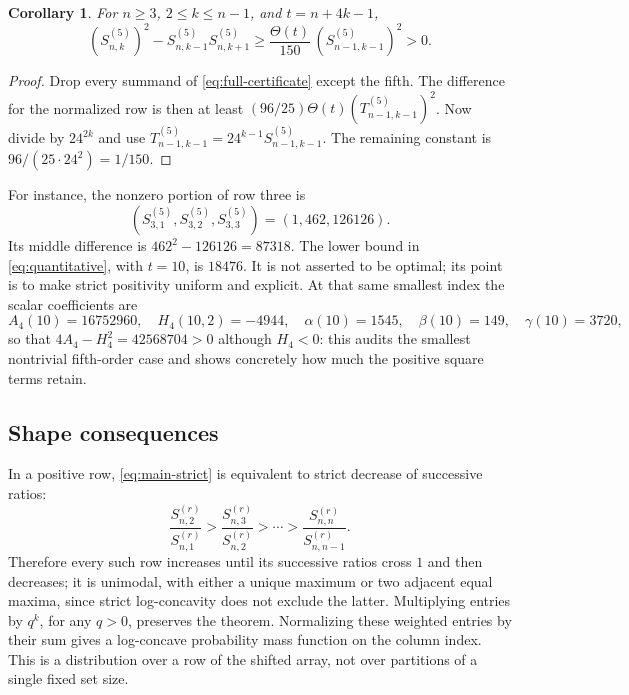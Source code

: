 \documentclass[11pt,a4paper]{article}
\numberwithin{equation}{section}
\newtheorem{corollary}[corollary]{Corollary}
\theoremstyle{definition}
\theoremstyle{remark}
\newcommand{\Snum}[3]{S^{(#1)}_{#2,#3}}
\begin{document}
\begin{corollary}\label{cor:quantitative}
For $n\ge3$, $2\le k\le n-1$, and $t=n+4k-1$,
\begin{equation}\label{eq:quantitative}
 (\Snum5nk)^2-\Snum5n{k-1}\Snum5n{k+1}
 \ge\frac{\Theta(t)}{150}\,(\Snum5{n-1}{k-1})^2>0.
\end{equation}
\end{corollary}
\begin{proof}
Drop every summand of \eqref{eq:full-certificate} except the fifth.
The difference for the normalized row is then at least
$(96/25)\Theta(t)(T^{(5)}_{n-1,k-1})^2$.
Now divide by $24^{2k}$ and use
$T^{(5)}_{n-1,k-1}=24^{k-1}S^{(5)}_{n-1,k-1}$.
The remaining constant is $96/(25\cdot24^2)=1/150$.
\end{proof}

For instance, the nonzero portion of row three is
\[
 (S^{(5)}_{3,1},S^{(5)}_{3,2},S^{(5)}_{3,3})=(1,462,126126).
\]
Its middle difference is $462^2-126126=87318$.
The lower bound in \eqref{eq:quantitative}, with $t=10$, is $18476$.
It is not asserted to be optimal; its point is to make strict positivity
uniform and explicit. At that same smallest index the scalar coefficients
are
\[
 A_4(10)=16752960,\quad H_4(10,2)=-4944,\quad
 \alpha(10)=1545,\quad\beta(10)=149,\quad\gamma(10)=3720,
\]
so that $4A_4-H_4^2=42568704>0$ although $H_4<0$: this audits the smallest
nontrivial fifth-order case and shows concretely how much the positive
square terms retain.

\subsection{Shape consequences}

In a positive row, \eqref{eq:main-strict} is equivalent to strict decrease
of successive ratios:
\begin{equation}\label{eq:ratio-monotonicity}
 \frac{S^{(r)}_{n,2}}{S^{(r)}_{n,1}}>
 \frac{S^{(r)}_{n,3}}{S^{(r)}_{n,2}}>\cdots>
 \frac{S^{(r)}_{n,n}}{S^{(r)}_{n,n-1}} .
\end{equation}
Therefore every such row increases until its successive ratios cross $1$
and then decreases; it is unimodal, with either a unique maximum or
two adjacent equal maxima, since strict log-concavity does not exclude the
latter. Multiplying entries by $q^k$, for any $q>0$, preserves the theorem.
Normalizing these weighted entries by their sum gives a log-concave
probability mass function on the column index. This is a distribution over
a row of the shifted array, not over partitions of a single fixed set size.
\end{document}
